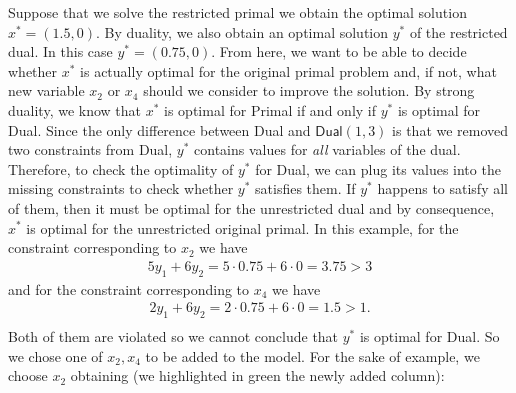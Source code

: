 \begin{center}
\end{center}

Suppose that we solve the restricted primal we obtain the optimal solution $x^* = (1.5, 0)$. By duality, we also obtain 
an optimal solution $y^*$ of the restricted dual. In this case $y^* = (0.75, 0)$. From here, we want to be able to decide whether $x^*$ is actually optimal
for the original primal problem and, if not, what new variable $x_2$ or $x_4$ should we consider to improve the solution. By strong
duality, we know that $x^*$ is optimal for \textsf{Primal} if and only if $y^*$ is optimal for \textsf{Dual}. Since the only 
difference between \textsf{Dual} and $\textsf{Dual}(1, 3)$ is that we removed two constraints from \textsf{Dual}, $y^*$
contains values for \emph{all} variables of the dual. Therefore,
to check the optimality of $y^*$ for \textsf{Dual}, we can plug its values into the missing constraints to check whether $y^*$ satisfies them. 
If $y^*$ happens to satisfy all of them, then it must be optimal for the unrestricted dual and by consequence, $x^*$ is optimal for the
unrestricted original primal.
In this example, for the constraint corresponding to $x_2$ we have
\begin{align*}
5 y_1 + 6 y_2 = 5 \cdot 0.75 + 6 \cdot 0 = 3.75 > 3
\end{align*}
and for the constraint corresponding to $x_4$ we have
\begin{align*}
2 y_1 + 6 y_2 = 2 \cdot 0.75 + 6 \cdot 0 = 1.5 > 1. \\
\end{align*}
Both of them are violated so we cannot conclude that $y^*$ is optimal for \textsf{Dual}. So we chose one of $x_2, x_4$ to be added to the model.
For the sake of example, we choose $x_2$ obtaining (we highlighted in green the newly added column):

